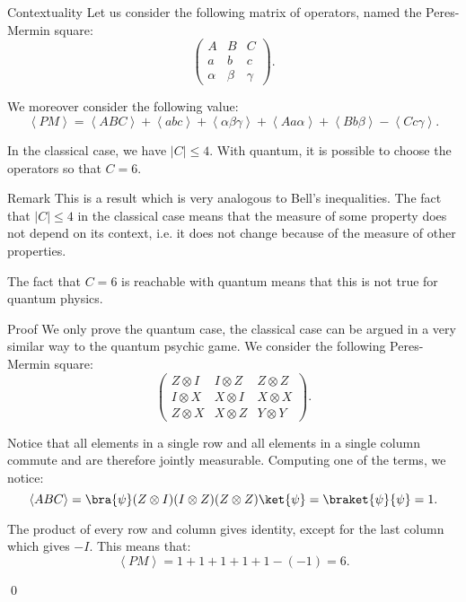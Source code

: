 \documentclass[a4paper]{article}
\begin{document}
\begin{parag}{Contextuality}
    Let us consider the following matrix of operators, named the Peres-Mermin square: 
    \[\begin{pmatrix} A & B & C \\ a & b & c \\ \alpha & \beta & \gamma \end{pmatrix}.\]

    We moreover consider the following value:
    \[\left\langle PM \right\rangle = \left\langle ABC \right\rangle + \left\langle abc \right\rangle + \left\langle \alpha \beta \gamma \right\rangle + \left\langle A a \alpha \right\rangle + \left\langle B b \beta \right\rangle - \left\langle C c \gamma \right\rangle.\]

    In the classical case, we have $\left|C\right| \leq 4$. With quantum, it is possible to choose the operators so that $C = 6$.

    \begin{subparag}{Remark}
        This is a result which is very analogous to Bell's inequalities. The fact that $\left|C\right| \leq 4$ in the classical case means that the measure of some property does not depend on its context, i.e. it does not change because of the measure of other properties.

        The fact that $C = 6$ is reachable with quantum means that this is not true for quantum physics.
    \end{subparag}

    \begin{subparag}{Proof}
        We only prove the quantum case, the classical case can be argued in a very similar way to the quantum psychic game. We consider the following Peres-Mermin square:
        \[\begin{pmatrix} Z \otimes I & I \otimes Z & Z \otimes Z \\ I \otimes X & X \otimes I & X \otimes X \\ Z \otimes X & X \otimes Z & Y \otimes Y \end{pmatrix}.\]

        Notice that all elements in a single row and all elements in a single column commute and are therefore jointly measurable. Computing one of the terms, we notice: 
        \[\left\langle ABC \right\rangle = \bra{\psi} \left(Z \otimes I\right) \left(I \otimes Z\right) \left(Z \otimes Z\right) \ket{\psi} = \braket{\psi}{\psi} = 1.\]

        The product of every row and column gives identity, except for the last column which gives $-I$. This means that: 
        \[\left\langle PM \right\rangle = 1 + 1 + 1 + 1 + 1 - \left(-1\right) = 6.\]

        \qed
    \end{subparag}
\end{parag}
\end{document}
